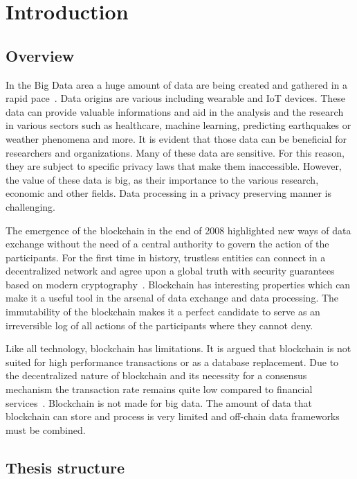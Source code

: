 \chapter{Introduction}
\label{introduction}

\section{Overview}
\label{introduction:overview}

In the Big Data area a huge amount of data are being created and gathered in a rapid pace~\cite{10.1109/SPW.2015.27}. Data origins are various including wearable and IoT devices. These data can provide valuable informations and aid in the analysis and the research in various sectors such as healthcare, machine learning, predicting earthquakes or weather phenomena and more. It is evident that those data can be beneficial for researchers and organizations. Many of these data are sensitive. For this reason, they are subject to specific privacy laws that make them inaccessible. However, the value of these data is big, as their importance to the various research, economic and other fields. Data processing in a privacy preserving manner is challenging.

The emergence of the blockchain in the end of 2008 highlighted new ways of data exchange without the need of a central authority to govern the action of the participants. For the first time in history, trustless entities can connect in a decentralized network and agree upon a global truth with security guarantees based on modern cryptography~\cite{10.1007/978-3-662-46803-6_10}. Blockchain has interesting properties which can make it a useful tool in the arsenal of data exchange and data processing. The immutability of the blockchain makes it a perfect candidate to serve as an irreversible log of all actions of the participants where they cannot deny.

Like all technology, blockchain has limitations. It is argued that blockchain is not suited for high performance transactions or as a database replacement. Due to the decentralized nature of blockchain and its necessity for a consensus mechanism the transaction rate remains quite low compared to financial services~\cite{Sompolinsky2015,Zohar:2015:BUH:2817191.2701411}.
Blockchain is not made for big data. The amount of data that blockchain can store and process is very limited and off-chain data frameworks must be combined.


\section{Thesis structure}
\label{introduction:structure}

